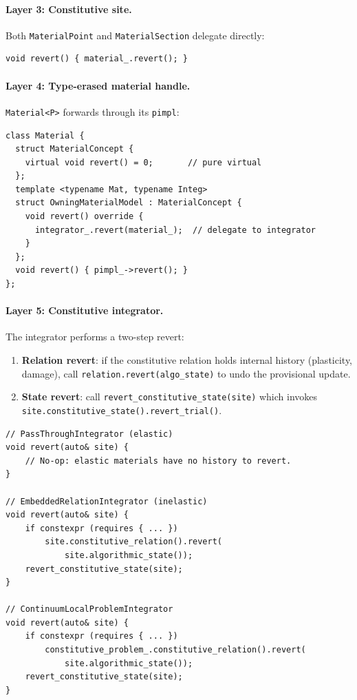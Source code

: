 \paragraph{Layer 3: Constitutive site.}
Both \texttt{MaterialPoint} and \texttt{MaterialSection} delegate
directly:
\begin{lstlisting}
void revert() { material_.revert(); }
\end{lstlisting}

\paragraph{Layer 4: Type-erased material handle.}
\texttt{Material<P>} forwards through its \texttt{pimpl}:
\begin{lstlisting}
class Material {
  struct MaterialConcept {
    virtual void revert() = 0;       // pure virtual
  };
  template <typename Mat, typename Integ>
  struct OwningMaterialModel : MaterialConcept {
    void revert() override {
      integrator_.revert(material_);  // delegate to integrator
    }
  };
  void revert() { pimpl_->revert(); }
};
\end{lstlisting}

\paragraph{Layer 5: Constitutive integrator.}
The integrator performs a two-step revert:
\begin{enumerate}
  \item \textbf{Relation revert}: if the constitutive relation holds
        internal history (plasticity, damage), call
        \texttt{relation.revert(algo\_state)} to undo the provisional
        update.
  \item \textbf{State revert}: call
        \texttt{revert\_constitutive\_state(site)} which invokes
        \texttt{site.constitutive\_state().revert\_trial()}.
\end{enumerate}

\begin{lstlisting}[caption={Revert in the three integrators},
                   label={lst:integrator-revert}]
// PassThroughIntegrator (elastic)
void revert(auto& site) {
    // No-op: elastic materials have no history to revert.
}

// EmbeddedRelationIntegrator (inelastic)
void revert(auto& site) {
    if constexpr (requires { ... })
        site.constitutive_relation().revert(
            site.algorithmic_state());
    revert_constitutive_state(site);
}

// ContinuumLocalProblemIntegrator
void revert(auto& site) {
    if constexpr (requires { ... })
        constitutive_problem_.constitutive_relation().revert(
            site.algorithmic_state());
    revert_constitutive_state(site);
}
\end{lstlisting}


